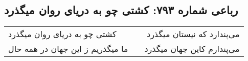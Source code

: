 \begin{center}
\section*{رباعی شماره ۷۹۳: کشتی چو به دریای روان میگذرد}
\label{sec:0793}
\begin{longtable}{l p{0.5cm} r}
کشتی چو به دریای روان میگذرد
&&
می‌پندارد که نیستان میگذرد
\\
ما میگذریم ز این جهان در همه حال
&&
می‌پندارم کاین جهان میگذرد
\\
\end{longtable}
\end{center}
